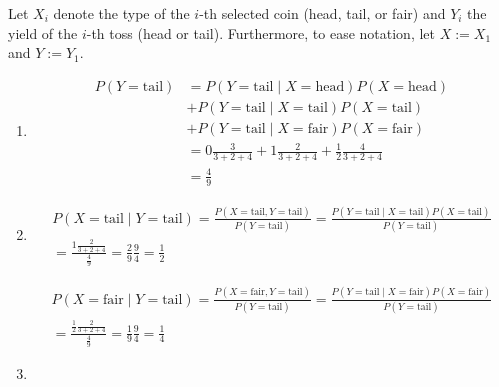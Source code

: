 \begin{solution}

Let $X_i$ denote the type of the $i$-th selected coin (head, tail, or fair) and $Y_i$ the yield of the $i$-th toss (head or tail).
Furthermore, to ease notation, let $X := X_1$ and $Y := Y_1$.

\begin{enumerate}[label = (\alph*)]

    \item

    \begin{align*}
        P(Y = \mathrm{tail})
        & =
        P(Y = \mathrm{tail} \mid X = \mathrm{head}) P(X = \mathrm{head}) \\
        & +
        P(Y = \mathrm{tail} \mid X = \mathrm{tail}) P(X = \mathrm{tail}) \\
        & +
        P(Y = \mathrm{tail} \mid X = \mathrm{fair}) P(X = \mathrm{fair}) \\
        & =
        0 \frac{3}{3 + 2 + 4} + 1 \frac{2}{3 + 2 + 4} + \frac{1}{2} \frac{4}{3 + 2 + 4} \\
        & =
        \frac{4}{9}
    \end{align*}

    \item

    \begin{multline*}
        P(X = \mathrm{tail} \mid Y = \mathrm{tail})
        =
        \frac{P(X = \mathrm{tail}, Y = \mathrm{tail})}{P(Y = \mathrm{tail})}
        =
        \frac{P(Y = \mathrm{tail} \mid X = \mathrm{tail}) P(X = \mathrm{tail})}{P(Y = \mathrm{tail})} \\
        =
        \frac{1 \frac{2}{3 + 2 + 4}}{\frac{4}{9}}
        =
        \frac{2}{9} \frac{9}{4}
        =
        \frac{1}{2}
    \end{multline*}

    \begin{multline*}
        P(X = \mathrm{fair} \mid Y = \mathrm{tail})
        =
        \frac{P(X = \mathrm{fair}, Y = \mathrm{tail})}{P(Y = \mathrm{tail})}
        =
        \frac{P(Y = \mathrm{tail} \mid X = \mathrm{fair}) P(X = \mathrm{fair})}{P(Y = \mathrm{tail})} \\
        =
        \frac{\frac{1}{2} \frac{2}{3 + 2 + 4}}{\frac{4}{9}}
        =
        \frac{1}{9} \frac{9}{4}
        =
        \frac{1}{4}
    \end{multline*}

    \item


\end{enumerate}
\end{solution}
